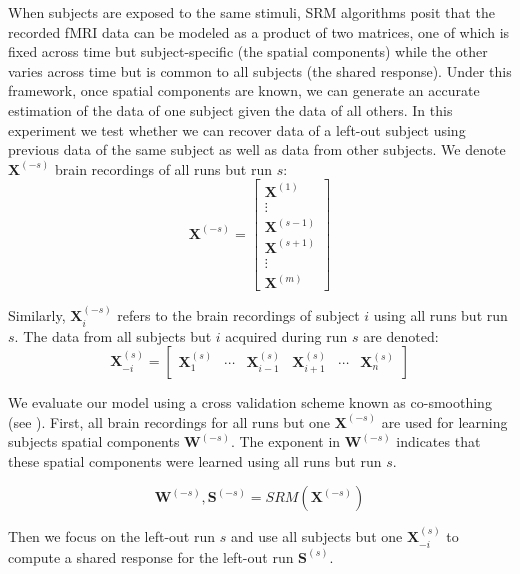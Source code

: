 When subjects are exposed to the same stimuli, SRM algorithms posit that the recorded fMRI data can be modeled as a product of two matrices, one of which is fixed across time but subject-specific (the spatial components) while the other varies across time but is common to all subjects (the shared response).
%
Under this framework, once spatial components are known, we can generate an accurate estimation of the data of one subject given the data of all others.
%
In this experiment we test whether we can recover data of a left-out subject using previous data of the same subject as well as data from other subjects. 
We denote $\mathbf{X}^{(-s)}$ brain recordings of all runs but run $s$:
 \begin{equation*}
	 \mathbf{X}^{(-s)} = 
\begin{bmatrix}
	\mathbf{X}^{(1)} \\
	\vdots \\
	\mathbf{X}^{(s-1)} \\
	\mathbf{X}^{(s+1)} \\
	\vdots \\
	\mathbf{X}^{(m)}
\end{bmatrix}
\end{equation*}

Similarly, $\mathbf{X}_i^{(-s)}$ refers to the brain recordings of subject $i$ using all runs but run $s$. The data from all subjects but $i$ acquired during run $s$ are denoted:
\begin{equation*}
	\mathbf{X}^{(s)}_{-i} = 
\begin{bmatrix}
	\mathbf{X}_1^{(s)} & \cdots & \mathbf{X}^{(s)}_{i-1} & \mathbf{X}^{(s)}_{i+1} & \cdots & \mathbf{X}^{(s)}_{n} 
\end{bmatrix}
\end{equation*}

We evaluate our model using a cross validation scheme known as co-smoothing (see \cite{wu2018learning}). First, all brain recordings for all runs but one $\mathbf{X}^{(-s)}$ are used for learning subjects spatial components $\mathbf{W}^{(-s)}$. The exponent in $\mathbf{W}^{(-s)}$ indicates that these spatial components were learned using all runs but run $s$. 

\begin{equation*}
	\mathbf{W}^{(-s)}, \mathbf{S}^{(-s)} = SRM(\mathbf{X}^{(-s)})
\end{equation*}

Then we focus on the left-out run $s$ and use all subjects but one $\mathbf{X}^{(s)}_{-i}$ to compute a shared response for the left-out run $\mathbf{S}^{(s)}$.

